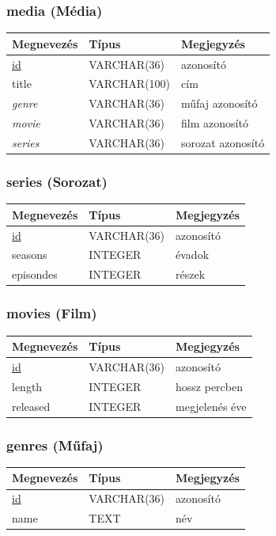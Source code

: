 \documentclass[12pt,a4paper,titlepage]{article}  %
\begin{document}
\subsubsection{media (Média)}
\begin{tabular}{|l|l|l|}
	\hline
	Megnevezés & Típus & Megjegyzés \\
	\hline
	\underline{id} & VARCHAR(36) & azonosító \\
	\hline
	title & VARCHAR(100) & cím \\
	\hline
	\textit{genre} & VARCHAR(36) & műfaj azonosító \\
	\hline
	\textit{movie} & VARCHAR(36) & film azonosító \\
	\hline
	\textit{series} & VARCHAR(36) & sorozat azonosító \\
	\hline
\end{tabular}

\subsubsection{series (Sorozat)}
\begin{tabular}{|l|l|l|}
	\hline
	Megnevezés & Típus & Megjegyzés \\
	\hline
	\underline{id} & VARCHAR(36) & azonosító \\
	\hline
	seasons & INTEGER & évadok \\
	\hline
	episondes & INTEGER & részek \\
	\hline
\end{tabular}

\subsubsection{movies (Film)}
\begin{tabular}{|l|l|l|}
	\hline
	Megnevezés & Típus & Megjegyzés \\
	\hline
	\underline{id} & VARCHAR(36) & azonosító \\
	\hline
	length & INTEGER & hossz percben \\
	\hline
	released & INTEGER & megjelenés éve \\
	\hline
\end{tabular}

\subsubsection{genres (Műfaj)}
\begin{tabular}{|l|l|l|}
	\hline
	Megnevezés & Típus & Megjegyzés \\
	\hline
	\underline{id} & VARCHAR(36) & azonosító \\
	\hline
	name & TEXT & név \\
	\hline
\end{tabular}
\end{document}
